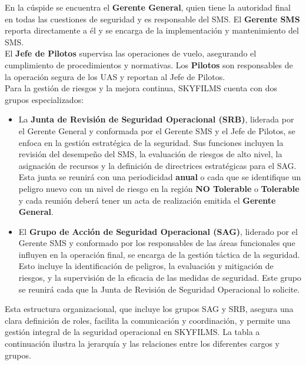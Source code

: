 En la cúspide se encuentra el \textbf{Gerente General}, quien tiene la autoridad final en todas las cuestiones de seguridad y es responsable del SMS. El \textbf{Gerente SMS} reporta directamente a él y se encarga de la implementación y mantenimiento del SMS.\\

El \textbf{Jefe de Pilotos} supervisa las operaciones de vuelo, asegurando el cumplimiento de procedimientos y normativas. Los \textbf{Pilotos} son responsables de la operación segura de los UAS y reportan al Jefe de Pilotos.\\

Para la gestión de riesgos y la mejora continua, SKYFILMS cuenta con dos grupos especializados:

\begin{itemize}
    \item La \textbf{Junta de Revisión de Seguridad Operacional (SRB)}, liderada por el Gerente General y conformada por el Gerente SMS y el Jefe de Pilotos, se enfoca en la gestión estratégica de la seguridad. Sus funciones incluyen la revisión del desempeño del SMS, la evaluación de riesgos de alto nivel, la asignación de recursos y la definición de directrices estratégicas para el SAG. Esta junta se reunirá con una periodicidad \textbf{anual} o cada que se identifique un peligro nuevo con un nivel de riesgo en la región \textbf{NO Tolerable} o \textbf{Tolerable} y cada reunión deberá tener un acta de realización emitida el \textbf{Gerente General}.
    \item El \textbf{Grupo de Acción de Seguridad Operacional (SAG)}, liderado por el Gerente SMS y conformado por los responsables de las áreas funcionales que influyen en la operación final, se encarga de la gestión táctica de la seguridad. Esto incluye la identificación de peligros, la evaluación y mitigación de riesgos, y la supervisión de la eficacia de las medidas de seguridad. Este grupo se reunirá cada que la Junta de Revisión de Seguridad Operacional lo solicite.
\end{itemize}

Esta estructura organizacional, que incluye los grupos SAG y SRB, asegura una clara definición de roles, facilita la comunicación y coordinación, y permite una gestión integral de la seguridad operacional en SKYFILMS. La tabla a continuación ilustra la jerarquía y las relaciones entre los diferentes cargos y grupos.

